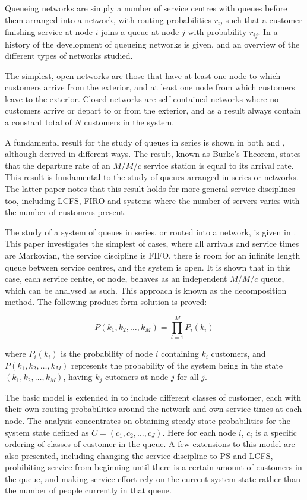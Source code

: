 \documentclass{article}
\begin{document}
Queueing networks are simply a number of service centres with queues before
them arranged into a network, with routing probabilities $r_{ij}$ such that a
customer finishing service at node $i$ joins a queue at node $j$ with
probability $r_{ij}$.
In \cite{rege90} a history of the development of queueing networks is given, and an overview of the different types of networks studied.

The simplest, open networks are those that have at least one node to which
customers arrive from the exterior, and at least one node from which customers leave to the exterior.
Closed networks are self-contained networks where no customers arrive or depart to or from the exterior, and as a result always contain a constant total of $N$ customers in the system.

A fundamental result for the study of queues in series is shown in both \cite{burke56} and \cite{reich57}, although derived in different ways.
The result, known as Burke's Theorem, states that the departure rate of an $M/M/c$ service station is equal to its arrival rate.
This result is fundamental to the study of queues arranged in series or networks.
The latter paper notes that this result holds for more general service disciplines too, including LCFS, FIRO and systems where the number of servers varies with the number of customers present.

The study of a system of queues in series, or routed into a network, is given in \cite{jackson57}.
This paper investigates the simplest of cases, where all arrivals and service times are Markovian, the service discipline is FIFO, there is room for an infinite length queue between service centres, and the system is open.
It is shown that in this case, each service centre, or node, behaves as an
independent $M/M/c$ queue, which can be analysed as such.
This approach is known as the decomposition method.
The following product form solution is proved:

\begin{equation}
    P(k_1, k_2, \dotsc, k_M) = \prod_{i=1}^M P_i(k_i)
\end{equation}

where $P_i(k_i)$ is the probability of node $i$ containing $k_i$ customers, and $P(k_1, k_2, \dotsc, k_M)$ represents the probability of the system being in the state $(k_1, k_2, \dotsc, k_M)$, having $k_j$ cutomers at node $j$ for all $j$.

The basic model is extended in \cite{kelly75} to include different classes of customer, each with their own routing probabilities around the network and own service times at each node.
The analysis concentrates on obtaining steady-state probabilities for the system state defined as $C = (c_1, c_2, ... , c_J)$.
Here for each node $i$, $c_i$ is a specific ordering of classes of customer in the queue.
A few extensions to this model are also presented, including changing the service discipline to PS and LCFS, prohibiting service from beginning until there is a certain amount of customers in the queue, and making service effort rely on the current system state rather than the number of people currently in that queue.
\end{document}
